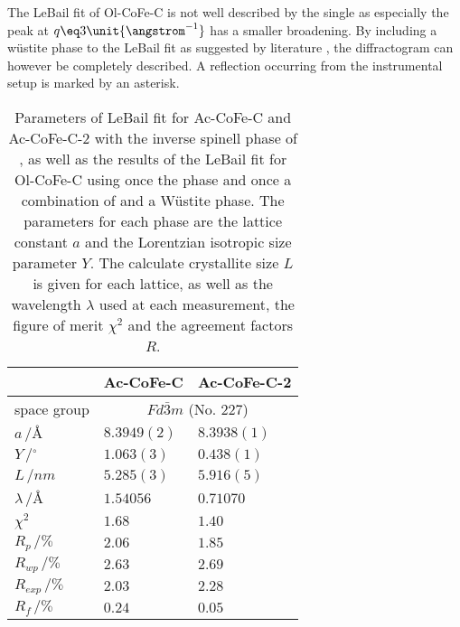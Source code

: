 \documentclass[\main/dresen_thesis.tex]{subfiles}
\begin{document}
  The LeBail fit of Ol-CoFe-C is not well described by the single  as especially the peak at $q \eq 3 \unit{\angstrom^{-1}}$ has a smaller broadening.
  By including a w\"ustite phase to the LeBail fit as suggested by literature \cite{Bodnarchuk_2009_Excha}, the diffractogram can however be completely described.
  A reflection occurring from the instrumental setup is marked by an asterisk.
  \begin{table}[ht]
    \centering
    \caption{\label{tab:monolayers:nanoparticle:discussion:xrdLeBail}Parameters of LeBail fit for Ac-CoFe-C and Ac-CoFe-C-2 with the inverse spinell phase of , as well as the results of the LeBail fit for Ol-CoFe-C using once the  phase and once a combination of  and a W\"ustite phase. The parameters for each phase are the lattice constant $a$ and the Lorentzian isotropic size parameter $Y$. The calculate crystallite size $L$ is given for each lattice, as well as the wavelength $\lambda$ used at each measurement, the figure of merit $\chi^2$ and the agreement factors $R$.}
    \begin{tabular}{ l | l | l }
      \hline
      \rule{0pt}{2ex}                                 & \textbf{Ac-CoFe-C} & \textbf{Ac-CoFe-C-2} \\
      \hline
      \rule{0pt}{2ex}space group & \multicolumn{2}{c}{$Fd\bar{3}m$ (No. 227)} \\
      \hline
      \rule{0pt}{2ex} $a \,/ \unit{\angstrom}$        & $8.3949(2)$        & $8.3938(1)$\\
      \rule{0pt}{2ex} $Y \,/ \unit{^\circ}$           & $1.063(3)$         & $0.438(1)$ \\
      \hline
      \rule{0pt}{2ex} $L \,/ \unit{nm}$               & $5.285(3)$         & $5.916(5)$ \\
      \hline
      \rule{0pt}{2ex} $\lambda \,/ \unit{\angstrom}$  & $1.54056$          & $0.71070$ \\
      \hline
      \rule{0pt}{2ex} $\chi^2$                        & $1.68$             & $1.40$ \\
      \rule{0pt}{2ex} $R_p \,/ \unit{\%}$                           & $2.06$             & $1.85$ \\
      \rule{0pt}{2ex} $R_{wp} \,/ \unit{\%}$                        & $2.63$             & $2.69$ \\
      \rule{0pt}{2ex} $R_{exp} \,/ \unit{\%}$                       & $2.03$             & $2.28$ \\
      \rule{0pt}{2ex} $R_{f} \,/ \unit{\%}$                         & $0.24$             & $0.05$ \\

\end{tabular}
\end{table}
\end{document}
